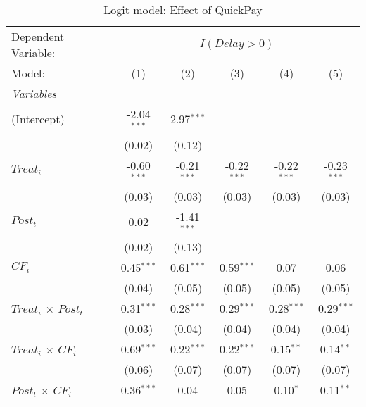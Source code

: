 \documentclass[
]{article}
\begin{document}
\begin{table}[htbp]
   \centering
   \caption{Logit model: Effect of QuickPay}
   \begin{tabular}{lccccc}
      \tabularnewline\midrule\midrule
      Dependent Variable: & \multicolumn{5}{c}{$I(Delay>0)$}\\
      Model:                                        & (1)           & (2)           & (3)           & (4)           & (5)\\
      \midrule \emph{Variables} &   &   &   &   &  \\
      (Intercept)                                   & -2.04$^{***}$ & 2.97$^{***}$  &               &               &   \\
                                                    & (0.02)        & (0.12)        &               &               &   \\
      $Treat_i$                                     & -0.60$^{***}$ & -0.21$^{***}$ & -0.22$^{***}$ & -0.22$^{***}$ & -0.23$^{***}$\\
                                                    & (0.03)        & (0.03)        & (0.03)        & (0.03)        & (0.03)\\
      $Post_t$                                      & 0.02          & -1.41$^{***}$ &               &               &   \\
                                                    & (0.02)        & (0.13)        &               &               &   \\
      $CF_i$                                        & 0.45$^{***}$  & 0.61$^{***}$  & 0.59$^{***}$  & 0.07          & 0.06\\
                                                    & (0.04)        & (0.05)        & (0.05)        & (0.05)        & (0.05)\\
      $Treat_i$ $\times$ $Post_t$                  & 0.31$^{***}$  & 0.28$^{***}$  & 0.29$^{***}$  & 0.28$^{***}$  & 0.29$^{***}$\\
                                                    & (0.03)        & (0.04)        & (0.04)        & (0.04)        & (0.04)\\
      $Treat_i$ $\times$ $CF_i$                    & 0.69$^{***}$  & 0.22$^{***}$  & 0.22$^{***}$  & 0.15$^{**}$   & 0.14$^{**}$\\
                                                    & (0.06)        & (0.07)        & (0.07)        & (0.07)        & (0.07)\\
      $Post_t$ $\times$ $CF_i$                     & 0.36$^{***}$  & 0.04          & 0.05          & 0.10$^{*}$    & 0.11$^{**}$\\

\end{tabular}
\end{table}
\end{document}
